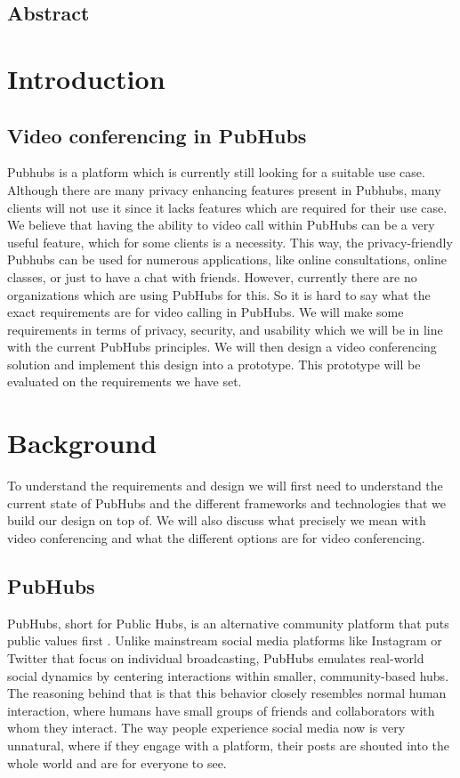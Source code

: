 \documentclass{report}
\begin{document}
\tableofcontents

\newpage
\section*{Abstract}


\chapter{Introduction}


\section{Video conferencing in PubHubs}
Pubhubs is a platform which is currently still looking for a suitable use case. Although there are many privacy enhancing features present in Pubhubs, many clients will not use it since it lacks features which are required for their use case. We believe that having the ability to video call within PubHubs can be a very useful feature, which for some clients is a necessity. 
This way, the privacy-friendly Pubhubs can be used for numerous applications, like online consultations, online
classes, or just to have a chat with friends. However, currently there are no organizations which are using PubHubs for this. So it is hard to say what the exact requirements are
for video calling in PubHubs. We will make some requirements in terms of privacy, security, and usability which we
will be in line with the current PubHubs principles. We will then design a video conferencing solution and implement
this design into a prototype. This prototype will be evaluated on the requirements we have set.


\chapter{Background}
To understand the requirements and design we will first need to understand the current state of PubHubs and the
different frameworks and technologies that we build our design on top of. We will also discuss what precisely we mean
with video conferencing and what the different options are for video conferencing.

\section{PubHubs}
PubHubs, short for Public Hubs, is an alternative community platform that puts public values first
\cite{jacobs_pubhubs_2023}
. Unlike mainstream social media platforms like Instagram or Twitter that focus on individual broadcasting, PubHubs
emulates real-world social dynamics by centering interactions within smaller, community-based hubs. The reasoning
behind that is that this behavior closely resembles normal human interaction, where humans have small groups of
friends and collaborators with whom they interact. The way people experience social media now is very unnatural,
where if they engage with a platform, their posts are shouted into the whole world and are for everyone to see.
\end{document}
